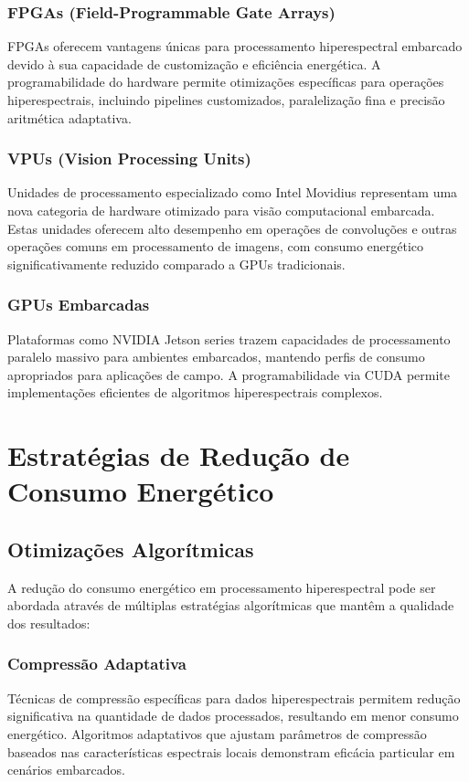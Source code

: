 \subsubsection{FPGAs (Field-Programmable Gate Arrays)}
FPGAs oferecem vantagens únicas para processamento hiperespectral embarcado devido à sua capacidade de customização e eficiência energética. A programabilidade do hardware permite otimizações específicas para operações hiperespectrais, incluindo pipelines customizados, paralelização fina e precisão aritmética adaptativa.

\subsubsection{VPUs (Vision Processing Units)}
Unidades de processamento especializado como Intel Movidius representam uma nova categoria de hardware otimizado para visão computacional embarcada. Estas unidades oferecem alto desempenho em operações de convoluções e outras operações comuns em processamento de imagens, com consumo energético significativamente reduzido comparado a GPUs tradicionais.

\subsubsection{GPUs Embarcadas}
Plataformas como NVIDIA Jetson series trazem capacidades de processamento paralelo massivo para ambientes embarcados, mantendo perfis de consumo apropriados para aplicações de campo. A programabilidade via CUDA permite implementações eficientes de algoritmos hiperespectrais complexos.

\section{Estratégias de Redução de Consumo Energético}\label{sec:reducao_consumo}

\subsection{Otimizações Algorítmicas}
A redução do consumo energético em processamento hiperespectral pode ser abordada através de múltiplas estratégias algorítmicas que mantêm a qualidade dos resultados:

\subsubsection{Compressão Adaptativa}
Técnicas de compressão específicas para dados hiperespectrais permitem redução significativa na quantidade de dados processados, resultando em menor consumo energético. Algoritmos adaptativos que ajustam parâmetros de compressão baseados nas características espectrais locais demonstram eficácia particular em cenários embarcados.

